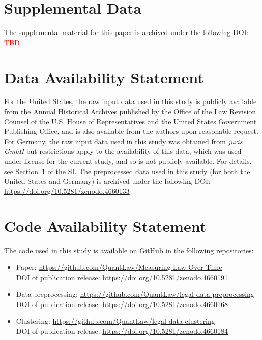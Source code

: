 \documentclass[utf8,sort&compress,table,hidelinks]{frontiersFPHY} %
\newcommand{\thesi}{SI\xspace}
\newcommand{\tbd}{\textcolor{red}{TBD}\xspace}
\begin{document}

\section*{Supplemental Data}

The supplemental material for this paper is archived under the following DOI:\\ 
\tbd

\section*{Data Availability Statement}

For the United States, the raw input data used in this study is publicly available from the Annual Historical Archives published by the Office of the Law Revision Counsel of the U.S. House of Representatives and the United States Government Publishing Office, and is also available from the authors upon reasonable request. 
For Germany, the raw input data used in this study was obtained from \emph{juris GmbH} but restrictions apply to the availability of this data, which was used under license for the current study, and so is not publicly available. 
For details, see Section~1 of the \thesi. 
The preprocessed data used in this study (for both the United States and Germany) is archived under the following DOI:\\ \url{https://doi.org/10.5281/zenodo.4660133}

\section*{Code Availability Statement}

The code used in this study is available on GitHub in the following repositories: 
\begin{itemize}
	\item Paper: \url{https://github.com/QuantLaw/Measuring-Law-Over-Time}\\
	DOI of publication release: \url{https://doi.org/10.5281/zenodo.4660191}
	\item Data preprocessing: \url{https://github.com/QuantLaw/legal-data-preprocessing}\\
	DOI of publication release: \url{https://doi.org/10.5281/zenodo.4660168}
	\item Clustering: \url{https://github.com/QuantLaw/legal-data-clustering}\\
	DOI of publication release: \url{https://doi.org/10.5281/zenodo.4660184}
\end{itemize}
\end{document}
